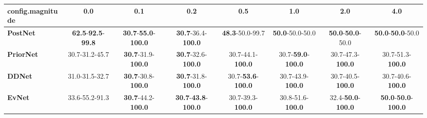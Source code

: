 \begin{tabular}{lccccccc}
\toprule
\textbf{config.magnitude} &                                        0.0 &                                         0.1 &                                         0.2 &                                0.5 &                                1.0 &                                2.0 &                                         4.0 \\
\midrule
\textbf{PostNet } &  \textbf{62.5}-\textbf{92.5}-\textbf{99.8} &  \textbf{30.7}-\textbf{55.0}-\textbf{100.0} &           \textbf{30.7}-36.4-\textbf{100.0} &            \textbf{48.3}-50.0-99.7 &            \textbf{50.0}-50.0-50.0 &   \textbf{50.0}-\textbf{50.0}-50.0 &            \textbf{50.0}-\textbf{50.0}-50.0 \\
\textbf{PriorNet} &                             30.7-31.2-45.7 &           \textbf{30.7}-31.9-\textbf{100.0} &           \textbf{30.7}-32.6-\textbf{100.0} &           30.7-44.1-\textbf{100.0} &  30.7-\textbf{59.0}-\textbf{100.0} &           30.7-47.3-\textbf{100.0} &                                 30.7-51.3-\textbf{100.0} \\
\textbf{DDNet   } &                             31.0-31.5-32.7 &           \textbf{30.7}-30.8-\textbf{100.0} &           \textbf{30.7}-31.8-\textbf{100.0} &  30.7-\textbf{53.6}-\textbf{100.0} &           30.7-43.9-\textbf{100.0} &           30.7-40.5-\textbf{100.0} &                    30.7-40.6-\textbf{100.0} \\
\textbf{EvNet   } &                             33.6-55.2-91.3 &           \textbf{30.7}-44.2-\textbf{100.0} &  \textbf{30.7}-\textbf{43.8}-\textbf{100.0} &           30.7-39.3-\textbf{100.0} &           30.8-51.6-\textbf{100.0} &  32.4-\textbf{50.0}-\textbf{100.0} &  \textbf{50.0}-\textbf{50.0}-\textbf{100.0} \\
\bottomrule
\end{tabular}
